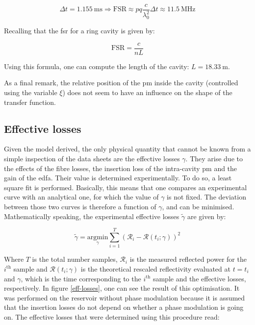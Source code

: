 \begin{equation}
	\Delta t = \SI{1.155}{\milli\second} \Longrightarrow \text{FSR} \approx  p q \frac{c}{\lambda_0^2} \Delta t  \approx \SI{11.5}{\mega\hertz}
\end{equation}

Recalling that the \gls{fsr} for a ring cavity is given by:

\begin{equation}
	\mathrm{FSR} = \frac{c}{nL}
\end{equation}

Using this formula, one can compute the length of the cavity: $L=\SI{18.33}{\metre}$.

As a final remark, the relative position of the \gls{pm} inside the cavity (controlled using the variable $\xi$) does not seem to have an influence on the shape of the transfer function.


\subsection{Effective losses}

\label{subsec-effective-losses}

Given the model derived, the only physical quantity that cannot be known from a simple inspection of the data sheets are the effective losses $\gamma$. They arise due to the effects of the fibre losses, the insertion loss of the intra-cavity \gls{pm} and the gain of the \gls{edfa}. Their value is determined experimentally. To do so, a least square fit is performed. Basically, this means that one compares an experimental curve with an analytical one, for which the value of $\gamma$ is not fixed. The deviation between those two curves is therefore a function of $\gamma$, and can be minimised. Mathematically speaking, the experimental effective losses $\tilde{\gamma}$ are given by:

\begin{equation}
	\tilde{\gamma} = \underset{\gamma}{\mathrm{argmin}} \sum_{i=1}^T (\mathcal{R}_i - \mathcal{R}(t_i;\gamma))^2
\end{equation}

Where $T$ is the total number samples, $\mathcal{R}_i$ is the measured reflected power for the $i^{\text{th}}$ sample and $\mathcal{R}(t_i;\gamma)$ is the theoretical rescaled reflectivity evaluated at $t=t_i$ and $\gamma$, which is the time corresponding to the $i^{\text{th}}$ sample and the effective losses, respectively. In figure \ref{eff-losses}, one can see the result of this optimisation. It was performed on the reservoir without phase modulation because it is assumed that the insertion losses do not depend on whether a phase modulation is going on. The effective losses that were determined using this procedure read:

